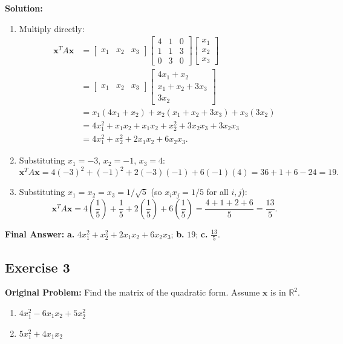 \documentclass[11pt, letterpaper]{article}
\theoremstyle{definition}
\theoremstyle{remark}
\begin{document}
\textbf{Solution:}
\begin{enumerate}[label=\alph*.]
    \item Multiply directly:
    \begin{align*}
    \mathbf{x}^T A \mathbf{x} &= \begin{bmatrix} x_1 & x_2 & x_3 \end{bmatrix} \begin{bmatrix} 4 & 1 & 0 \\ 1 & 1 & 3 \\ 0 & 3 & 0 \end{bmatrix} \begin{bmatrix} x_1 \\ x_2 \\ x_3 \end{bmatrix} \\
    &= \begin{bmatrix} x_1 & x_2 & x_3 \end{bmatrix} \begin{bmatrix} 4x_1 + x_2 \\ x_1 + x_2 + 3x_3 \\ 3x_2 \end{bmatrix} \\
    &= x_1(4x_1 + x_2) + x_2(x_1 + x_2 + 3x_3) + x_3(3x_2) \\
    &= 4x_1^2 + x_1 x_2 + x_1 x_2 + x_2^2 + 3x_2 x_3 + 3x_2 x_3 \\
    &= 4x_1^2 + x_2^2 + 2x_1 x_2 + 6x_2 x_3.
    \end{align*}
    \item Substituting $x_1 = -3$, $x_2 = -1$, $x_3 = 4$:
    \[
    \mathbf{x}^T A \mathbf{x} = 4(-3)^2 + (-1)^2 + 2(-3)(-1) + 6(-1)(4) = 36 + 1 + 6 - 24 = 19.
    \]
    \item Substituting $x_1 = x_2 = x_3 = 1/\sqrt{5}$ (so $x_i x_j = 1/5$ for all $i,j$):
    \[
    \mathbf{x}^T A \mathbf{x} = 4\left(\frac{1}{5}\right) + \frac{1}{5} + 2\left(\frac{1}{5}\right) + 6\left(\frac{1}{5}\right) = \frac{4 + 1 + 2 + 6}{5} = \frac{13}{5}.
    \]
\end{enumerate}
\textbf{Final Answer:} \textbf{a.} $4x_1^2 + x_2^2 + 2x_1 x_2 + 6x_2 x_3$; \quad \textbf{b.} $19$; \quad \textbf{c.} $\frac{13}{5}$.

\hrulefill

\subsection*{Exercise 3}
\textbf{Original Problem:} Find the matrix of the quadratic form. Assume $\mathbf{x}$ is in $\mathbb{R}^2$.
\begin{enumerate}[label=\alph*.]
    \item $4x_1^2 - 6x_1x_2 + 5x_2^2$
    \item $5x_1^2 + 4x_1x_2$
\end{enumerate}
\end{document}
